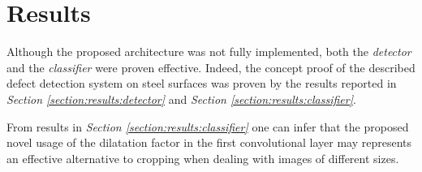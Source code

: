\section{Results}\label{section:results}
\par{
	Although the proposed architecture was not fully implemented, both the \emph{detector} and the \emph{classifier} were proven effective. Indeed, the concept proof of the described defect detection system on steel surfaces was proven by the results reported in \emph{Section \ref{section:results:detector}} and \emph{Section \ref{section:results:classifier}}.
}
\par{
	From results in \emph{Section \ref{section:results:classifier}} one can infer that the proposed novel usage of the dilatation factor in the first convolutional layer may represents an effective alternative to cropping when dealing with images of different sizes.
}

